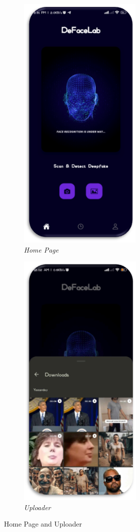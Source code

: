 \begin{figure}[ht]
    \centering
    \begin{subfigure}[b]{0.45\textwidth}
        \centering
        \includegraphics[height=5in]{img/Homepage.png}
        \caption{\textit{Home Page}}
    \end{subfigure}
    \hfill
    \begin{subfigure}[b]{0.45\textwidth}
        \centering
        \includegraphics[height=5in]{img/uploaderv3.png}
        \caption{\textit{Uploader}}
    \end{subfigure}
    \caption{Home Page and Uploader}
\end{figure}


